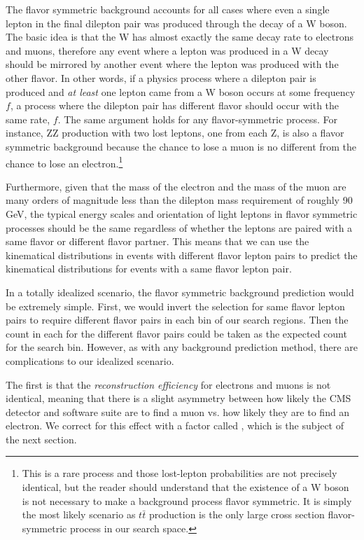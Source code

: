     The flavor symmetric background accounts for all cases where even a single lepton in the final dilepton pair was produced through the decay of a W boson. The basic idea is that the W has almost exactly the same decay rate to electrons and muons, therefore any event where a lepton was produced in a W decay should be mirrored by another event where the lepton was produced with the other flavor. In other words, if a physics process where a dilepton pair is produced and \emph{at least} one lepton came from a W boson occurs at some frequency $f$, a process where the dilepton pair has different flavor should occur with the same rate, $f$. The same argument holds for any flavor-symmetric process. For instance, ZZ production with two lost leptons, one from each Z, is also a flavor symmetric background because the chance to lose a muon is no different from the chance to lose an electron.\footnote{This is a rare process and those lost-lepton probabilities are not precisely identical, but the reader should understand that the existence of a W boson is not necessary to make a background process flavor symmetric. It is simply the most likely scenario as $t\bar{t}$ production is the only large cross section flavor-symmetric process in our search space.}

    Furthermore, given that the mass of the electron and the mass of the muon are many orders of magnitude less than the dilepton mass requirement of roughly 90 GeV, the typical energy scales and orientation of light leptons in flavor symmetric processes should be the same regardless of whether the leptons are paired with a same flavor or different flavor partner. This means that we can use the kinematical distributions in events with different flavor lepton pairs to predict the kinematical distributions for events with a same flavor lepton pair.

    In a totally idealized scenario, the flavor symmetric background prediction would be extremely simple. First, we would invert the selection for same flavor lepton pairs to require different flavor pairs in each \MET bin of our search regions. Then the count in each \MET for the different flavor pairs could be taken as the expected count for the search bin. However, as with any background prediction method, there are complications to our idealized scenario. 

    The first is that the \emph{reconstruction efficiency} for electrons and muons is not identical, meaning that there is a slight asymmetry between how likely the CMS detector and software suite are to find a muon vs. how likely they are to find an electron. We correct for this effect with a factor called \rsfof, which is the subject of the next section.


